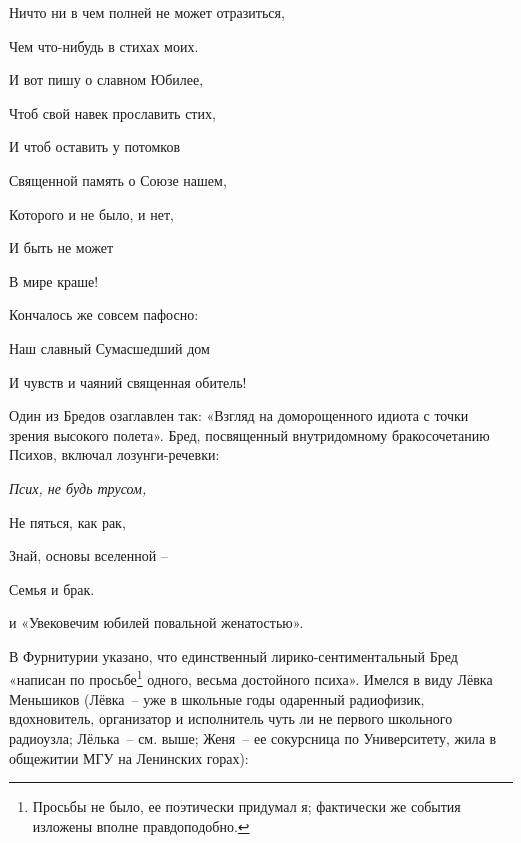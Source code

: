 \indent

{\itshape

Ничто ни в чем полней не может отразиться,
    
Чем что-нибудь в стихах моих.


}

\newpage
{}






\restoregeometry

{\itshape

	
	И вот пишу о славном Юбилее,
	
	Чтоб свой навек прославить стих,
	
	И чтоб оставить у потомков
	
	Священной память о Союзе нашем,
	
	Которого и не было, и нет,
	
	И быть не может
	
	В мире краше!
}

\indent

\noindent
Кончалось же совсем пафосно:



{\itshape

    \vspace{10pt}
    
	Наш славный Сумасшедший дом
	
	И чувств и чаяний священная обитель!
}


\indent

Один из Бредов озаглавлен так: «Взгляд на доморощенного идиота с точки зрения высокого полета». Бред, посвященный внутридомному бракосочетанию Психов, включал лозунги-речевки:


\vspace{10pt}

{\itshape
    Псих, не будь трусом,
    
	Не пяться, как рак,
	
	Знай, основы вселенной – 
	
	Семья и брак.
}

\indent 

\noindent
и «Увековечим юбилей повальной женатостью».


В Фурнитурии указано, что единственный лирико-сентиментальный Бред «написан по просьбе\footnote{Просьбы не было, ее поэтически придумал я; фактически же события изложены вполне правдоподобно.}  одного, весьма достойного психа». Имелся в виду Лёвка Меньшиков (Лёвка~-- уже в школьные годы одаренный радиофизик, вдохновитель, организатор и исполнитель чуть ли не первого школьного радиоузла; Лёлька~-- см. выше; Женя~-- ее сокурсница по Университету, жила в общежитии МГУ на Ленинских горах):

